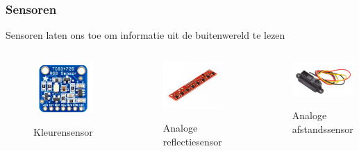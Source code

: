 \documentclass
   [kulak] %
   {kulakbeamer}
\begin{document}
\begin{frame}
	\frametitle{Sensoren}
	Sensoren laten ons toe om informatie uit de buitenwereld te lezen
	\begin{columns}
		\begin{figure}
			\centering
			\includegraphics[width=.7\textwidth]{kleurensensor}
			\caption{Kleurensensor}\cite{TCS34725KleurSensorBOB}
		\end{figure}
		\begin{figure}
			\centering
			\includegraphics[width=.8\textwidth]{reflectiesensor}
			\caption{Analoge reflectiesensor}\cite{QTR-8AAnalogeReflexieSensorArray}
		\end{figure}
		\begin{figure}
			\centering
			\includegraphics[width=.9\textwidth]{afstandssensor}
			\caption{Analoge afstandssensor}\cite{AnalogeAfstandssensor}
		\end{figure}
	\end{columns}
	

\end{frame}
\end{document}
